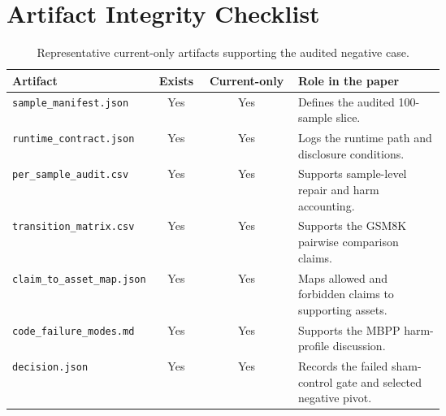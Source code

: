 \documentclass{article}
\begin{document}
\appendix

\section{Artifact Integrity Checklist}
\label{app:artifacts}

\begin{table}[h]
\centering
\caption{Representative current-only artifacts supporting the audited negative case.}
\label{tab:artifact-checklist}
\begin{tabular}{p{0.28\linewidth}ccp{0.34\linewidth}}
\toprule
Artifact & Exists & Current-only & Role in the paper \\
\midrule
\texttt{sample\_manifest.json} & Yes & Yes & Defines the audited 100-sample slice. \\
\texttt{runtime\_contract.json} & Yes & Yes & Logs the runtime path and disclosure conditions. \\
\texttt{per\_sample\_audit.csv} & Yes & Yes & Supports sample-level repair and harm accounting. \\
\texttt{transition\_matrix.csv} & Yes & Yes & Supports the GSM8K pairwise comparison claims. \\
\texttt{claim\_to\_asset\_map.json} & Yes & Yes & Maps allowed and forbidden claims to supporting assets. \\
\texttt{code\_failure\_modes.md} & Yes & Yes & Supports the MBPP harm-profile discussion. \\
\texttt{decision.json} & Yes & Yes & Records the failed sham-control gate and selected negative pivot. \\
\bottomrule
\end{tabular}
\end{table}



\end{document}
